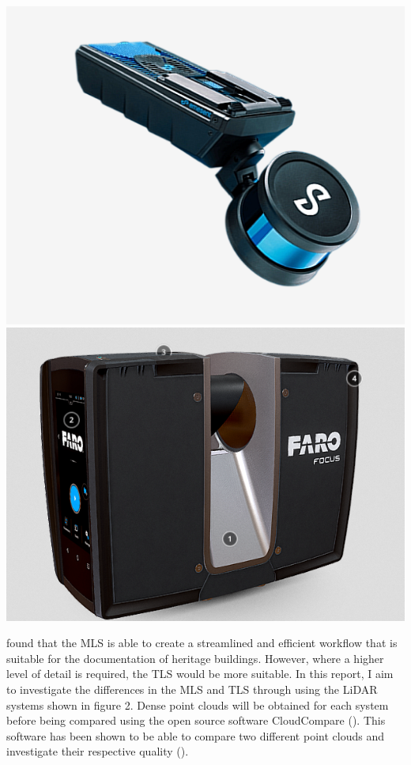 \documentclass[man]{apa7}
\begin{document}
\begin{minipage}{\linewidth}
  \includegraphics[height=\textheight/3,width=\textwidth/2]{figures/HoverMap.png}
  \includegraphics[height=\textheight/3,width=\textwidth/2]{figures/FaroFocus.png}
  \label{fig:TLSandMLS}
\end{minipage}

\Textcite{conti2024} found that the MLS is able to create a streamlined and efficient workflow that is suitable for the documentation of heritage buildings. However, where a higher level of detail is required, the TLS would be more suitable. In this report, I aim to investigate the differences in the MLS and TLS through using the LiDAR systems shown in figure 2. Dense point clouds will be obtained for each system before being compared using the open source software CloudCompare (\Textcite{cloudcomparesoftware}). This software has been shown to be able to compare two different point clouds and investigate their respective quality (\Textcite{girardeau2016}). 
\end{document}
